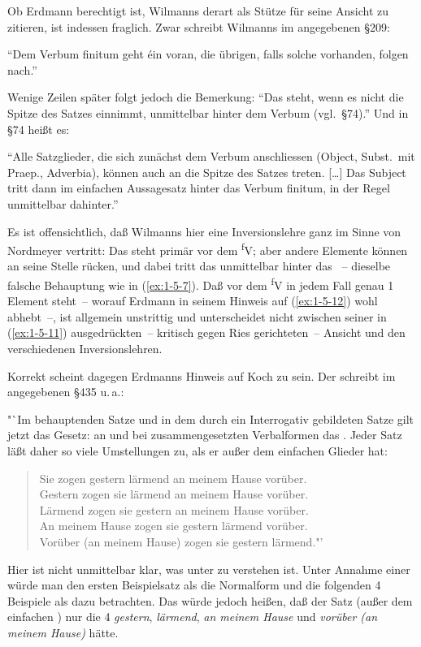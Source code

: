 \documentclass[output=paper]{langsci/langscibook}
\begin{document}
Ob Erdmann berechtigt ist, Wilmanns derart als Stütze für seine Ansicht zu zitieren, ist indessen fraglich. Zwar schreibt Wilmanns im angegebenen §209:
\begin{exe}
\ex\label{ex:1-5-12}
"`Dem Verbum finitum geht éin  voran, die übrigen, falls solche
vorhanden, folgen nach."' \citep[181]{Wilmanns1878}
\end{exe}
Wenige Zeilen später folgt jedoch die Bemerkung: "`Das  steht, wenn es nicht
die Spitze des Satzes einnimmt, unmittelbar hinter dem Verbum (vgl.\ §74)."' Und in
§74 heißt es:
\begin{exe}
\ex\label{ex:1-5-13}
"`Alle Satzglieder, die sich zunächst dem Verbum anschliessen (Object,
Subst.\ mit Praep., Adverbia), können auch an die Spitze des Satzes treten.
[\ldots] Das Subject tritt dann im einfachen Aussagesatz hinter das Verbum finitum, in der Regel unmittelbar dahinter."' \citep[42]{Wilmanns1878}
\end{exe}
Es ist offensichtlich, daß Wilmanns hier eine Inversionslehre ganz im Sinne von
Nordmeyer vertritt: Das  steht primär vor dem \textsuperscript{f}V; aber andere Elemente
können an seine Stelle rücken, und dabei tritt das  unmittelbar hinter das
~-- dieselbe falsche Behauptung wie in (\ref{ex:1-5-7}). Daß vor dem \textsuperscript{f}V in jedem Fall genau 1
Element steht~-- worauf Erdmann in seinem Hinweis auf (\ref{ex:1-5-12}) wohl abhebt~–, ist allgemein unstrittig und unterscheidet nicht zwischen seiner in (\ref{ex:1-5-11}) ausgedrückten~-- kritisch gegen Ries gerichteten~-- Ansicht und den verschiedenen Inversionslehren.

Korrekt scheint dagegen Erdmanns Hinweis auf Koch zu sein. Der schreibt im angegebenen §435 u.\,a.:
\begin{exe}\settowidth\jamwidth{219f]{Koch1860}}
\ex\label{ex:1-5-14}
"`Im behauptenden Satze und in dem durch ein Interrogativ gebildeten Satze
gilt jetzt das Gesetz: an  und bei zusammengesetzten Verbalformen das . Jeder Satz läßt daher so viele
Umstellungen zu, als er außer dem einfachen  Glieder hat:
\begin{quotation}
Sie zogen gestern lärmend an meinem Hause vorüber. \\
Gestern zogen sie lärmend an meinem Hause vorüber. \\
Lärmend zogen sie gestern an meinem Hause vorüber. \\
An meinem Hause zogen sie gestern lärmend vorüber. \\
Vorüber (an meinem Hause) zogen sie gestern lärmend."' 
\end{quotation}
\end{exe}
Hier ist nicht unmittelbar klar, was unter  zu verstehen
ist. Unter Annahme einer  würde man den ersten
Beispielsatz als die Normalform und die folgenden 4 Beispiele als
 dazu betrachten. Das würde jedoch heißen, daß der Satz
(außer dem einfachen ) nur die 4  \textit{gestern},
\textit{lärmend}, \textit{an meinem Hause} und \textit{vorüber (an meinem Hause)} hätte.
\end{document}
